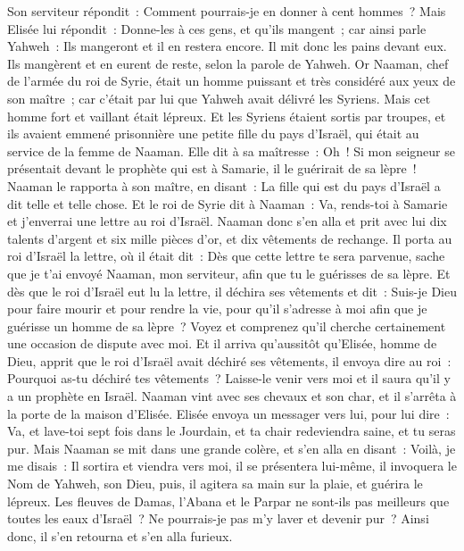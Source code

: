 \begin{multicols}{2}
Son serviteur répondit~: Comment pourrais-je en donner à cent hommes~? Mais Elisée lui répondit~: Donne-les à ces gens, et qu'ils mangent~; car ainsi parle Yahweh~: Ils mangeront et il en restera encore.
Il mit donc les pains devant eux. Ils mangèrent et en eurent de reste, selon la parole de Yahweh.
\VerseOne{}Or Naaman, chef de l'armée du roi de Syrie, était un homme puissant et très considéré aux yeux de son maître~; car c'était par lui que Yahweh avait délivré les Syriens. Mais cet homme fort et vaillant était lépreux.
Et les Syriens étaient sortis par troupes, et ils avaient emmené prisonnière une petite fille du pays d'Israël, qui était au service de la femme de Naaman.
Elle dit à sa maîtresse~: Oh~! Si mon seigneur se présentait devant le prophète qui est à Samarie, il le guérirait de sa lèpre~!
Naaman le rapporta à son maître, en disant~: La fille qui est du pays d'Israël a dit telle et telle chose.
Et le roi de Syrie dit à Naaman~: Va, rends-toi à Samarie et j'enverrai une lettre au roi d'Israël. Naaman donc s'en alla et prit avec lui dix talents d'argent et six mille pièces d'or, et dix vêtements de rechange.
Il porta au roi d'Israël la lettre, où il était dit~: Dès que cette lettre te sera parvenue, sache que je t'ai envoyé Naaman, mon serviteur, afin que tu le guérisses de sa lèpre.
Et dès que le roi d'Israël eut lu la lettre, il déchira ses vêtements et dit~: Suis-je Dieu pour faire mourir et pour rendre la vie, pour qu'il s'adresse à moi afin que je guérisse un homme de sa lèpre~? Voyez et comprenez qu'il cherche certainement une occasion de dispute avec moi.
Et il arriva qu'aussitôt qu'Elisée, homme de Dieu, apprit que le roi d'Israël avait déchiré ses vêtements, il envoya dire au roi~: Pourquoi as-tu déchiré tes vêtements~? Laisse-le venir vers moi et il saura qu'il y a un prophète en Israël.
Naaman vint avec ses chevaux et son char, et il s'arrêta à la porte de la maison d'Elisée.
Elisée envoya un messager vers lui, pour lui dire~: Va, et lave-toi sept fois dans le Jourdain, et ta chair redeviendra saine, et tu seras pur.
Mais Naaman se mit dans une grande colère, et s'en alla en disant~: Voilà, je me disais~: Il sortira et viendra vers moi, il se présentera lui-même, il invoquera le Nom de Yahweh, son Dieu, puis, il agitera sa main sur la plaie, et guérira le lépreux.
Les fleuves de Damas, l'Abana et le Parpar ne sont-ils pas meilleurs que toutes les eaux d'Israël~? Ne pourrais-je pas m'y laver et devenir pur~? Ainsi donc, il s'en retourna et s'en alla furieux.

\end{multicols}
